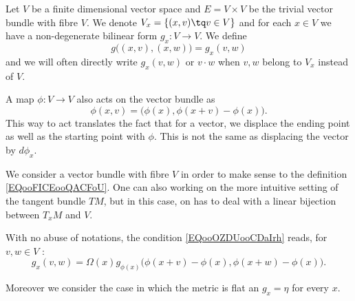 Let \( V\) be a finite dimensional vector space and \( E=V\times V\) be the trivial vector bundle with fibre \( V\). We denote \( V_x=\{ (x,v)\tq v\in V \}\) and for each \( x\in V\) we have a non-degenerate bilinear form \( g_x\colon V\to V\). We define
\begin{equation}
    g\big( (x,v),(x,w) \big)=g_x(v,w)
\end{equation}
and we will often directly write \( g_x(v,w)\) or \( v\cdot w\) when \( v,w\) belong to \(V_x\) instead of \( V\).

A map \( \phi\colon V\to V\) also acts on the vector bundle as
\begin{equation}        \label{EQooFICEooQACFoU}
    \phi(x,v)=\big( \phi(x),\phi(x+v)-\phi(x) \big).
\end{equation}
This way to act translates the fact that for a vector, we displace the ending point as well as the starting point with \( \phi\). This is not the same as displacing the vector by \( d\phi_x\).

\begin{remark}
    We consider a vector bundle with fibre \( V\) in order to make sense to the definition \eqref{EQooFICEooQACFoU}. One can also working on the more intuitive setting of the tangent bundle \( TM\), but in this case, on has to deal with a linear bijection between \( T_xM\) and \( V\).
\end{remark}

With no abuse of notations, the condition \eqref{EQooOZDUooCDaIrh} reads, for \( v,w\in V\) :
\begin{equation}\label{EQooFZUFooTGWpBn}
    g_x(v,w)=\Omega(x)g_{\phi(x)}\big(  \phi(x+v)-\phi(x),\phi(x+w)-\phi(x)  \big).
\end{equation}

Moreover we consider the case in which the metric is flat an \( g_x=\eta\) for every \( x\).
